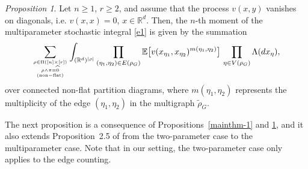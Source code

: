 \documentclass[bj,authoryear,noshowframe]{imsart}
\theoremstyle{plain}
\theoremstyle{remark}
\newcommand{\E}{\mathbb{E}}
\newcommand{\R}{\mathbb{R}}
\def\real{{\mathord{\mathbb R}}}
\newtheorem{prop}{Proposition}[section]
\begin{document}
  \begin{prop}
 \label{p01-1-4} 
 Let $n \geq 1$, $r\geq 2$, and assume that the process $v(x,y)$ vanishes
 on diagonals, i.e. $v(x,x) = 0$, $x\in \real^d$. 
 Then, the $n$-th moment of the multiparameter stochastic integral
  \eqref{e1} is given by the summation 
 \begin{equation} 
 \nonumber %
 \sum_{\rho \in \Pi ( [n] \times [r] )
 \atop {
     \rho \wedge \pi = \widehat{0}
     \atop
         {\rm (non-flat)}
 }
 }
 \int_{(\R^d )^{|\rho |}}
   \prod_{(\eta_1,\eta_2) \in E(\rho_G)}
  \E \big[ v(x_{\eta_1},x_{\eta_2})^{m({\eta_1,\eta_2})} \big] 
    \ \! \prod_{\eta \in V(\rho_G)}
 \Lambda(dx_\eta ), 
 \end{equation} 
 over connected non-flat partition diagrams,
 where $m ({\eta_1,\eta_2})$ represents the multiplicity of the edge
 $(\eta_1,\eta_2)$ in the multigraph $\widetilde{\rho}_G$. 
 \end{prop}
 The next proposition is a consequence of Propositions~\ref{mainthm-1}
 and \ref{p01-1-4},
  and it also extends Proposition~2.5 of \cite{jansen}
  from the two-parameter case to the multiparameter
  case. 
  Note that in our setting, the two-parameter case
  only applies to the edge counting. 
 
  \vspace{-0.2cm}
 
\end{document}
